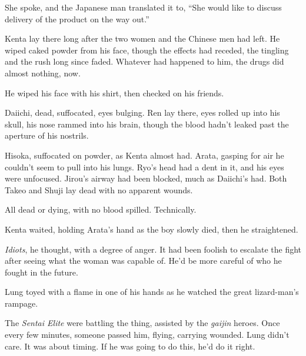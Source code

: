 She spoke, and the Japanese man translated it to, ``She would like to discuss delivery of the product on the way out.''



Kenta lay there long after the two women and the Chinese men had left.  He wiped caked powder from his face, though the effects had receded, the tingling and the rush long since faded.  Whatever had happened to him, the drugs did almost nothing, now.



He wiped his face with his shirt, then checked on his friends.



Daiichi, dead, suffocated, eyes bulging.  Ren lay there, eyes rolled up into his skull, his nose rammed into his brain, though the blood hadn't leaked past the aperture of his nostrils.



Hisoka, suffocated on powder, as Kenta almost had.  Arata, gasping for air he couldn't seem to pull into his lungs.  Ryo's head had a dent in it, and his eyes were unfocused.  Jirou's airway had been blocked, much as Daiichi's had.  Both Takeo and Shuji lay dead with no apparent wounds.



All dead or dying, with no blood spilled.  Technically.



Kenta waited, holding Arata's hand as the boy slowly died, then he straightened.



\emph{Idiots}, he thought, with a degree of anger.  It had been foolish to escalate the fight after seeing what the woman was capable of.  He'd be more careful of who he fought in the future.



\blacksquare






Lung toyed with a flame in one of his hands as he watched the great lizard-man's rampage.



The \emph{Sentai Elite }were battling the thing, assisted by the \emph{gaijin} heroes.  Once every few minutes, someone passed him, flying, carrying wounded.  Lung didn't care.  It was about timing.  If he was going to do this, he'd do it right.



